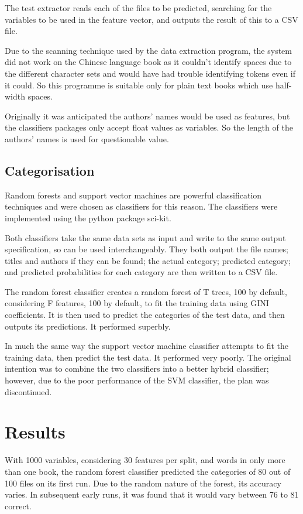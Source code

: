 \documentclass[11pt]{article}
\begin{document}
The test extractor reads each of the files to be predicted, searching for the
variables to be used in the feature vector, and outputs the result of this to a
CSV file.

Due to the scanning technique used by the data extraction program, the system
did not work on the Chinese language book as it couldn't identify spaces due to
the different character sets and would have had trouble identifying tokens even
if it could. So this programme is suitable only for plain text books which use
half-width spaces.

Originally it was anticipated the authors' names would be used as features, but
the classifiers packages only accept float values as variables. So the length of
the authors' names is used for questionable value.

\subsection{Categorisation}

Random forests and support vector machines are powerful classification
techniques and were chosen as classifiers for this reason. The classifiers were
implemented using the python package sci-kit.

Both classifiers take the same data sets as input and write to the same output
specification, so can be used interchangeably. They both output the file names;
titles and authors if they can be found; the actual category; predicted
category; and predicted probabilities for each category are then written to a
CSV file.

The random forest classifier creates a random forest of T trees, 100 by
default, considering F features, 100 by default, to fit the training data using
GINI coefficients. It is then used to predict the categories of the test data,
and then outputs its predictions. It performed superbly.

In much the same way the support vector machine classifier attempts to fit the
training data, then predict the test data. It performed very poorly. The
original intention was to combine the two classifiers into a better hybrid
classifier; however, due to the poor performance of the SVM classifier, the plan
was discontinued.

\section{Results}

With 1000 variables, considering 30 features per split, and words in only more
than one book, the random forest classifier predicted the categories of 80 out
of 100 files on its first run. Due to the random nature of the forest, its
accuracy varies. In subsequent early runs, it was found that it would vary
between 76 to 81 correct.
\end{document}
